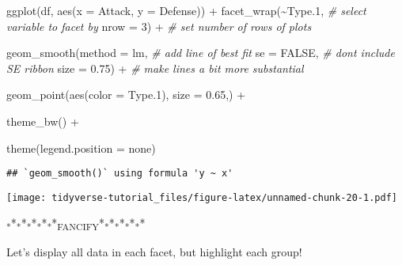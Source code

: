 \documentclass[
]{article}
\newenvironment{Shaded}{\begin{snugshade}}{\end{snugshade}}
\newcommand{\AttributeTok}[1]{\textcolor[rgb]{0.77,0.63,0.00}{#1}}
\newcommand{\CommentTok}[1]{\textcolor[rgb]{0.56,0.35,0.01}{\textit{#1}}}
\newcommand{\ConstantTok}[1]{\textcolor[rgb]{0.00,0.00,0.00}{#1}}
\newcommand{\DecValTok}[1]{\textcolor[rgb]{0.00,0.00,0.81}{#1}}
\newcommand{\FloatTok}[1]{\textcolor[rgb]{0.00,0.00,0.81}{#1}}
\newcommand{\FunctionTok}[1]{\textcolor[rgb]{0.00,0.00,0.00}{#1}}
\newcommand{\NormalTok}[1]{#1}
\newcommand{\SpecialCharTok}[1]{\textcolor[rgb]{0.00,0.00,0.00}{#1}}
\newcommand{\StringTok}[1]{\textcolor[rgb]{0.31,0.60,0.02}{#1}}
\begin{document}
\begin{Shaded}
\begin{Highlighting}[]
\FunctionTok{ggplot}\NormalTok{(df, }\FunctionTok{aes}\NormalTok{(}\AttributeTok{x =}\NormalTok{ Attack, }\AttributeTok{y =}\NormalTok{ Defense)) }\SpecialCharTok{+}
  \FunctionTok{facet\_wrap}\NormalTok{(}\SpecialCharTok{\textasciitilde{}}\NormalTok{Type}\FloatTok{.1}\NormalTok{,                   }\CommentTok{\# select variable to facet by}
             \AttributeTok{nrow =} \DecValTok{3}\NormalTok{) }\SpecialCharTok{+}                \CommentTok{\# set number of rows of plots}
  
  \FunctionTok{geom\_smooth}\NormalTok{(}\AttributeTok{method =} \StringTok{\textquotesingle{}lm\textquotesingle{}}\NormalTok{,             }\CommentTok{\# add line of best fit}
              \AttributeTok{se =} \ConstantTok{FALSE}\NormalTok{,                }\CommentTok{\# don\textquotesingle{}t include SE ribbon}
              \AttributeTok{size =} \FloatTok{0.75}\NormalTok{) }\SpecialCharTok{+}             \CommentTok{\# make lines a bit more substantial}
  
  \FunctionTok{geom\_point}\NormalTok{(}\FunctionTok{aes}\NormalTok{(}\AttributeTok{color =}\NormalTok{ Type}\FloatTok{.1}\NormalTok{),  }
             \AttributeTok{size =} \FloatTok{0.65}\NormalTok{,) }\SpecialCharTok{+}
  
  \FunctionTok{theme\_bw}\NormalTok{() }\SpecialCharTok{+} 
  
  \FunctionTok{theme}\NormalTok{(}\AttributeTok{legend.position =} \StringTok{\textquotesingle{}none\textquotesingle{}}\NormalTok{)}
\end{Highlighting}
\end{Shaded}

\begin{verbatim}
## `geom_smooth()` using formula 'y ~ x'
\end{verbatim}

\texttt{[image: tidyverse-tutorial\_files/figure-latex/unnamed-chunk-20-1.pdf]}

\textsubscript{*}*\textsubscript{*}*\textsubscript{*}*\textsubscript{*}*\textsubscript{*}*\textsubscript{FANCIFY}*\textsubscript{*}*\textsubscript{*}*\textsubscript{*}*\textsubscript{*}*

Let's display all data in each facet, but highlight each group!
\end{document}
